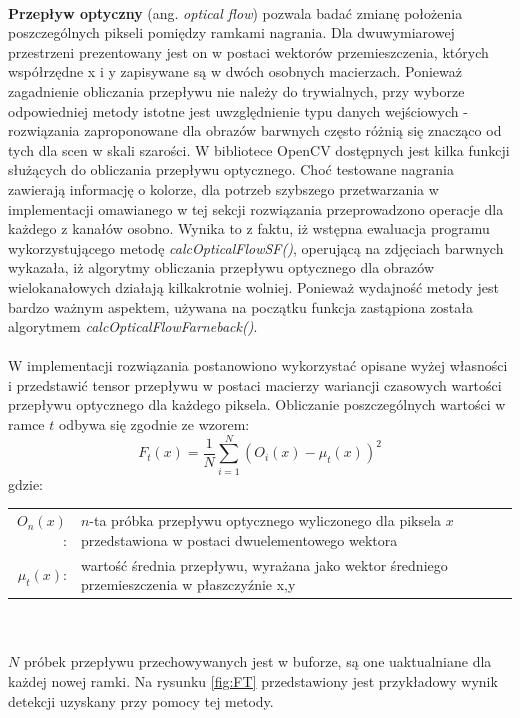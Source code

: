 \paragraph{}
\textbf{Przepływ optyczny} (ang. \textit{optical flow}) pozwala badać zmianę położenia poszczególnych pikseli pomiędzy ramkami nagrania. Dla dwuwymiarowej przestrzeni prezentowany jest on w postaci wektorów przemieszczenia, których współrzędne x i y zapisywane są w dwóch osobnych macierzach. Ponieważ zagadnienie obliczania przepływu nie należy do trywialnych, przy wyborze odpowiedniej metody istotne jest uwzględnienie typu danych wejściowych - rozwiązania zaproponowane dla obrazów barwnych często różnią się znacząco od tych dla scen w skali szarości. W bibliotece OpenCV dostępnych jest kilka funkcji służących do obliczania przepływu optycznego. Choć testowane nagrania zawierają informację o kolorze, dla potrzeb szybszego przetwarzania w implementacji omawianego w tej sekcji rozwiązania przeprowadzono operacje dla każdego z kanałów osobno. Wynika to z faktu, iż wstępna ewaluacja programu wykorzystującego metodę \textit{calcOpticalFlowSF()}, operującą na zdjęciach barwnych wykazała, iż algorytmy obliczania przepływu optycznego dla obrazów wielokanałowych działają kilkakrotnie wolniej. Ponieważ wydajność metody jest bardzo ważnym aspektem, używana na początku funkcja zastąpiona została algorytmem \textit{calcOpticalFlowFarneback()}. 
\paragraph{}
W implementacji rozwiązania postanowiono wykorzystać opisane wyżej własności i przedstawić tensor przepływu w postaci macierzy wariancji czasowych wartości przepływu optycznego dla każdego piksela. Obliczanie poszczególnych wartości w ramce $t$ odbywa się zgodnie ze wzorem:
\begin{equation}
F_{t}(x) = \frac{1}{N}\sum_{i=1}^{N} (O_{i}(x)-\mu_{t}(x))^2
\end{equation}
gdzie:\\ 
\hspace*{3em}
\begin{tabular}{r p{}}
$O_{n}(x)$: &  $n$-ta próbka przepływu optycznego wyliczonego dla piksela $x$ przedstawiona w postaci dwuelementowego wektora\\
$\mu_{t}(x)$: & wartość średnia przepływu, wyrażana jako wektor średniego przemieszczenia w płaszczyźnie x,y 
\end{tabular} \\
~\\
$N$ próbek przepływu przechowywanych jest w buforze, są one uaktualniane dla każdej nowej ramki. Na rysunku \ref{fig:FT} przedstawiony jest przykładowy wynik detekcji uzyskany przy pomocy tej metody.


